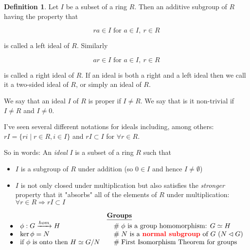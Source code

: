 \documentclass{article}
\theoremstyle{definition}
\newtheorem{definition}{Definition}[section]
\begin{document}
\begin{definition}
Let $I$ be a subset of a ring $R$. Then an additive subgroup of $R$ having the property that

\begin{equation*}
ra \in I \text{ for }  a \in I, \: r \in R
\end{equation*}

\bigskip
\noindent
is called a left ideal of $R$.  Similarly

\begin{equation*}
ar \in I \text{ for }  a \in I, \: r \in R
\end{equation*}

\bigskip
\noindent
is called a right ideal of $R$. If an ideal is both a right and a left ideal then we call it a two-sided ideal of $R$, or simply an ideal of $R$.
\end{definition}

\noindent
 We say that an ideal $I$ of $R$ is proper if $I \neq R$.  We say that is it non-trivial if $I \neq R$ and  $I \neq  0$.

\bigskip
\noindent
I've seen several different notations for ideals including, among others:  $rI = \{ri \mid r \in R, i \in I\}$ and 
$rI \subset I$ for $\forall r \in R$. 

\bigskip
\noindent
So in words: An \emph{ideal} $I$ is a subset of a ring $R$ such that

\begin{itemize}
\item $I$ is a subgroup of $R$ under addition (so $0 \in I$ and hence $I \neq \emptyset$) 
\item $I$  is not only closed under multiplication but also satisfies the \emph{stronger} property that it  
"absorbs" all of the elements of $R$ under multiplication: $\forall r \in R \Rightarrow rI \subset I$
\end{itemize}

\bigskip
\bigskip
\begin{mybox}
\begin{equation*}
\begin{array}{lllll}
&& \underline{\mathbf{Groups}} \\ 
\bullet&  \phi: G \xrightarrow{hom} H                            &\quad  \mathrel{\#} \text{$\phi$ is a group homomorphism: $G \simeq H$}                               \\
\bullet&  \ker \phi = N                                                    &\quad  \mathrel{\#} \text{$N$ is a \textbf{{\color{red} normal subgroup}} of $G$ ($N \lhd G$)}  \\
\bullet&  \text{if $\phi$ is onto then $H \simeq G/N$}   &\quad \mathrel{\#} \text{First Isomorphism Theorem for groups}                                                \\
\end{array}
\end{equation*}
\end{mybox}
\end{document}
